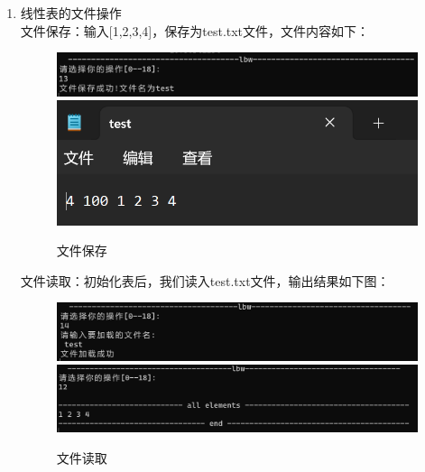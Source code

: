 \documentclass[supercite]{Experimental_Report}
\theoremstyle{definition}
\begin{document}
\begin{enumerate}
		\item 线性表的文件操作\\
		文件保存：输入[1,2,3,4]，保存为test.txt文件，文件内容如下：
		\begin{figure}[H]
			\centering
			\includegraphics[width=1\linewidth]{images/文件操作成功.png}
			\includegraphics[width=1\linewidth]{images/文件操作结果.png}
			\caption{文件保存}
			\label{fig1-34}
		\end{figure}
	
		文件读取：初始化表后，我们读入test.txt文件，输出结果如下图：
		\begin{figure}[H]
			\centering
			\includegraphics[width=1\linewidth]{images/文件加载成功.png}
			\includegraphics[width=1\linewidth]{images/文件加载结果.png}
			\caption{文件读取}
			\label{fig1-35}
		\end{figure}
	

\end{enumerate}
\end{document}
